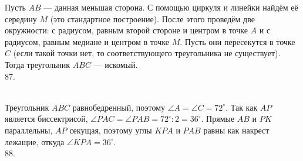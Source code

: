 \documentclass[12pt]{article}
\begin{document}
Пусть $AB$ --- данная меньшая сторона. С помощью циркуля и линейки найдём её середину $M$ (это стандартное построение). После этого проведём две окружности: с радиусом, равным второй стороне и центром в точке $A$ и с радиусом, равным медиане и центром в точке $M.$ Пусть они пересекутся в точке $C$ (если такой точки нет, то соответствующего треугольника не существует). Тогда треугольник $ABC$ --- искомый.\\
87. \begin{figure}[ht!]
\end{figure}\\
Треугольник $ABC$ равнобедренный, поэтому $\angle A=\angle C =72^\circ.$ Так как $AP$ является биссектрисой, $\angle PAC=\angle PAB=72^\circ:2=36^\circ.$ Прямые $AB$ и $PK$ параллельны, $AP$ секущая, поэтому углы $KPA$ и $PAB$ равны как накрест лежащие, откуда $\angle KPA=36^\circ.$\\
88. \begin{figure}[ht!]
\end{figure}\\
\end{document}
